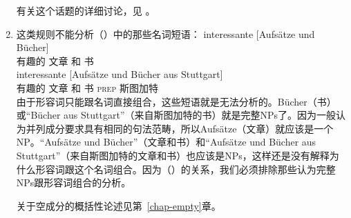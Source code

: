 \begin{enumerate}
有关这个话题的详细讨论，见 。\nocite{MuellerLehrbuch1}

\item %

这类规则不能分析（）中的那些名词短语：
\eal
\ex 
\gll interessante [Aufsätze und Bücher]\\
     有趣的 \spacebr{}文章 和 书\\
\ex 
\gll interessante [Aufsätze und Bücher aus Stuttgart]\\
     有趣的 \spacebr{}文章 和 书 \textsc{prep} 斯图加特\\
\zl
由于形容词只能跟名词直接组合，这些短语就是无法分析的。Bücher（书）或“Bücher aus Stuttgart”（来自斯图加特的书）就是完整NPs了。因为一般认为并列成分要求具有相同的句法范畴，所以Aufsätze（文章）就应该是一个NP。“Aufsätze und Bücher”（文章和书）和“Aufsätze und Bücher aus
  Stuttgart”（来自斯图加特的文章和书）也应该是NPs，这样还是没有解释为什么形容词跟这个名词组合。因为（）的关系，我们必须排除那些认为完整NPs跟形容词组合的分析。

关于空成分的概括性论述见第~\ref{chap-empty}章。


\end{enumerate}
